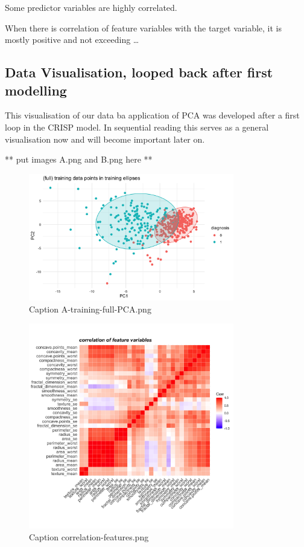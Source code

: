 \documentclass[]{article}
\begin{document}
Some predictor variables are highly correlated.

When there is correlation of feature variables with the target variable,
it is mostly positive and not exceeding \ldots{}

\subsection{Data Visualisation, looped back after first
modelling}\label{data-visualisation-looped-back-after-first-modelling}

This visualisation of our data ba application of PCA was developed after
a first loop in the CRISP model. In sequential reading this serves as a
general visualisation now and will become important later on.

** put images A.png and B.png here **

\begin{figure}
    \centering
    \includegraphics[width=0.8\textwidth]{images/A-training-full-PCA.png}
    \caption{Caption A-training-full-PCA.png}
    \label{fig:A-training-full-PCA}
\end{figure}

\begin{figure}
    \centering
    \includegraphics[width=0.8\textwidth]{images/correlation-features.png}
    \caption{Caption correlation-features.png}
    \label{fig:correlation-feature}
\end{figure}
\end{document}
